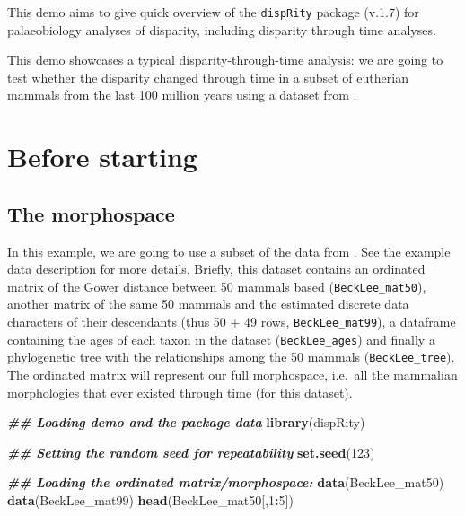 \documentclass[
]{book}
\newenvironment{Shaded}{\begin{snugshade}}{\end{snugshade}}
\newcommand{\DecValTok}[1]{\textcolor[rgb]{0.00,0.00,0.81}{#1}}
\newcommand{\DocumentationTok}[1]{\textcolor[rgb]{0.56,0.35,0.01}{\textbf{\textit{#1}}}}
\newcommand{\FunctionTok}[1]{\textcolor[rgb]{0.13,0.29,0.53}{\textbf{#1}}}
\newcommand{\NormalTok}[1]{#1}
\newcommand{\SpecialCharTok}[1]{\textcolor[rgb]{0.81,0.36,0.00}{\textbf{#1}}}
\begin{document}
This demo aims to give quick overview of the \texttt{dispRity} package (v.1.7) for palaeobiology analyses of disparity, including disparity through time analyses.

This demo showcases a typical disparity-through-time analysis: we are going to test whether the disparity changed through time in a subset of eutherian mammals from the last 100 million years using a dataset from \citet{beckancient2014}.

\hypertarget{before-starting}{%
\section{Before starting}\label{before-starting}}

\hypertarget{the-morphospace}{%
\subsection{The morphospace}\label{the-morphospace}}

In this example, we are going to use a subset of the data from \citet{beckancient2014}.
See the \protect\hyperlink{example-data}{example data} description for more details.
Briefly, this dataset contains an ordinated matrix of the Gower distance between 50 mammals based (\texttt{BeckLee\_mat50}), another matrix of the same 50 mammals and the estimated discrete data characters of their descendants (thus 50 + 49 rows, \texttt{BeckLee\_mat99}), a dataframe containing the ages of each taxon in the dataset (\texttt{BeckLee\_ages}) and finally a phylogenetic tree with the relationships among the 50 mammals (\texttt{BeckLee\_tree}).
The ordinated matrix will represent our full morphospace, i.e.~all the mammalian morphologies that ever existed through time (for this dataset).

\begin{Shaded}
\begin{Highlighting}[]
\DocumentationTok{\#\# Loading demo and the package data}
\FunctionTok{library}\NormalTok{(dispRity)}

\DocumentationTok{\#\# Setting the random seed for repeatability}
\FunctionTok{set.seed}\NormalTok{(}\DecValTok{123}\NormalTok{)}

\DocumentationTok{\#\# Loading the ordinated matrix/morphospace:}
\FunctionTok{data}\NormalTok{(BeckLee\_mat50)}
\FunctionTok{data}\NormalTok{(BeckLee\_mat99)}
\FunctionTok{head}\NormalTok{(BeckLee\_mat50[,}\DecValTok{1}\SpecialCharTok{:}\DecValTok{5}\NormalTok{])}
\end{Highlighting}
\end{Shaded}
\end{document}
